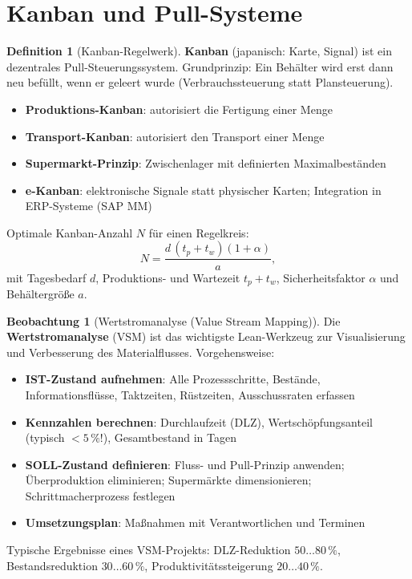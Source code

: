 ﻿\documentclass[a4paper,12pt]{report}
\theoremstyle{definition}
\newtheorem{definition}{Definition}
\newtheorem{beobachtung}{Beobachtung}
\begin{document}
\section{Kanban und Pull-Systeme}

\begin{definition}[Kanban-Regelwerk]
\textbf{Kanban} (japanisch: Karte, Signal) ist ein dezentrales Pull-Steuerungssystem.
Grundprinzip: Ein Behälter wird erst dann neu befüllt, wenn er geleert wurde
(Verbrauchssteuerung statt Plansteuerung).
\begin{itemize}
    \item[-] \textbf{Produktions-Kanban}: autorisiert die Fertigung einer Menge
    \item[-] \textbf{Transport-Kanban}: autorisiert den Transport einer Menge
    \item[-] \textbf{Supermarkt-Prinzip}: Zwischenlager mit definierten Maximalbeständen
    \item[-] \textbf{e-Kanban}: elektronische Signale statt physischer Karten;
          Integration in ERP-Systeme (SAP MM)
\end{itemize}
Optimale Kanban-Anzahl $N$ für einen Regelkreis:
\[
  N = \frac{d\,(t_p + t_w)(1 + \alpha)}{a},
\]
mit Tagesbedarf $d$, Produktions- und Wartezeit $t_p + t_w$,
Sicherheitsfaktor $\alpha$ und Behältergröße $a$.
\end{definition}

\begin{beobachtung}[Wertstromanalyse (Value Stream Mapping)]
Die \textbf{Wertstromanalyse} (VSM) ist das wichtigste Lean-Werkzeug
zur Visualisierung und Verbesserung des Materialflusses.
Vorgehensweise:
\begin{itemize}
    \item[-] \textbf{IST-Zustand aufnehmen}: Alle Prozessschritte, Bestände,
          Informationsflüsse, Taktzeiten, Rüstzeiten, Ausschussraten erfassen
    \item[-] \textbf{Kennzahlen berechnen}: Durchlaufzeit (DLZ), Wertschöpfungsanteil
          (typisch $< 5\,\%$!), Gesamtbestand in Tagen
    \item[-] \textbf{SOLL-Zustand definieren}: Fluss- und Pull-Prinzip anwenden;
          Überproduktion eliminieren; Supermärkte dimensionieren; Schrittmacherprozess festlegen
    \item[-] \textbf{Umsetzungsplan}: Maßnahmen mit Verantwortlichen und Terminen
\end{itemize}
Typische Ergebnisse eines VSM-Projekts: DLZ-Reduktion $50\ldots80\,\%$,
Bestandsreduktion $30\ldots60\,\%$, Produktivitätssteigerung $20\ldots40\,\%$.
\end{beobachtung}
\end{document}
